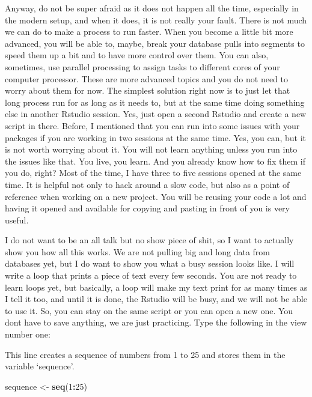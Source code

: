 \documentclass[]{book}
\newenvironment{Shaded}{\begin{snugshade}}{\end{snugshade}}
\newcommand{\DecValTok}[1]{\textcolor[rgb]{0.00,0.00,0.81}{#1}}
\newcommand{\KeywordTok}[1]{\textcolor[rgb]{0.13,0.29,0.53}{\textbf{#1}}}
\newcommand{\NormalTok}[1]{#1}
\newcommand{\OperatorTok}[1]{\textcolor[rgb]{0.81,0.36,0.00}{\textbf{#1}}}
\newcommand{\StringTok}[1]{\textcolor[rgb]{0.31,0.60,0.02}{#1}}
\begin{document}
Anyway, do not be super afraid as it does not happen all the time, especially in the modern setup, and when it does, it is not really your fault. There is not much we can do to make a process to run faster. When you become a little bit more advanced, you will be able to, maybe, break your database pulls into segments to speed them up a bit and to have more control over them. You can also, sometimes, use parallel processing to assign tasks to different cores of your computer processor. These are more advanced topics and you do not need to worry about them for now. The simplest solution right now is to just let that long process run for as long as it needs to, but at the same time doing something else in another Rstudio session. Yes, just open a second Rstudio and create a new script in there. Before, I mentioned that you can run into some issues with your packages if you are working in two sessions at the same time. Yes, you can, but it is not worth worrying about it. You will not learn anything unless you run into the issues like that. You live, you learn. And you already know how to fix them if you do, right? Most of the time, I have three to five sessions opened at the same time. It is helpful not only to hack around a slow code, but also as a point of reference when working on a new project. You will be reusing your code a lot and having it opened and available for copying and pasting in front of you is very useful.

I do not want to be an all talk but no show piece of shit, so I want to actually show you how all this works. We are not pulling big and long data from databases yet, but I do want to show you what a busy session looks like. I will write a loop that prints a piece of text every few seconds. You are not ready to learn loops yet, but basically, a loop will make my text print for as many times as I tell it too, and until it is done, the Rstudio will be busy, and we will not be able to use it. So, you can stay on the same script or you can open a new one. You dont have to save anything, we are just practicing. Type the following in the view number one:

This line creates a sequence of numbers from 1 to 25 and stores them in the variable `sequence'.

\begin{Shaded}
\begin{Highlighting}[]
\NormalTok{sequence <-}\StringTok{ }\KeywordTok{seq}\NormalTok{(}\DecValTok{1}\OperatorTok{:}\DecValTok{25}\NormalTok{)}
\end{Highlighting}
\end{Shaded}
\end{document}
